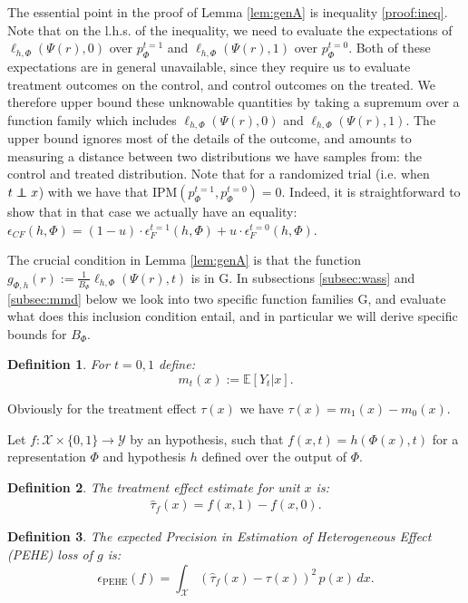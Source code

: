 \documentclass{article}
\newtheorem{thmappdef}{Definition}
\def\E{\mathbb{E}}
\def\cX{\mathcal X}
\def\cY{\mathcal Y}
\def\cF{\mathrm{G}}
\def \epehe{\epsilon_{\text{PEHE}}}
\newcommand\indep{\protect\mathpalette{\protect\independenT}{\perp}}
\def\independenT#1#2{\mathrel{\rlap{$#1#2$}\mkern2mu{#1#2}}}
\newcommand{\pc}{p^{t=0}}
\newcommand{\pt}{p^{t=1}}
\newcommand{\lythr}{\ell_{h,\Phi}(\Psi(r),t)}
\newcommand{\lyzerohpsi}{\ell_{h,\Phi}(\Psi(r),0)}
\newcommand{\lyonehpsi}{\ell_{h,\Phi}(\Psi(r),1)}
\begin{document}
The essential point in the proof of Lemma \ref{lem:genA} is inequality \ref{proof:ineq}. Note that on the l.h.s. of the inequality, we need to evaluate the expectations of $ \lyzerohpsi$ over $\pt_\Phi$ and $\lyonehpsi$ over $\pc_\Phi$. Both of these expectations are in general unavailable, since they require us to evaluate treatment outcomes on the control, and control outcomes on the treated. We therefore upper bound these unknowable quantities by taking a supremum over a function family which includes $\lyzerohpsi$ and $\lyonehpsi$. The upper bound ignores most of the details of the outcome, and amounts to measuring a distance between two distributions we have samples from: the control and treated distribution. Note that for a randomized trial (i.e. when $t \indep x$) with we have that $\text{IPM}(\pt_\Phi,\pc_\Phi) = 0$. Indeed, it is straightforward to show that in that case we actually have an equality: $\epsilon_{CF}(h,\Phi) = (1-u)\cdot \epsilon^{t=1}_{F}(h,\Phi) + u\cdot  \epsilon^{t=0}_{F}(h,\Phi)$.


The crucial condition in Lemma \ref{lem:genA} is that the function $g_{\Phi,h}(r) := \frac{1}{B_\Phi} \lythr$ is in $\cF$. In subsections \ref{subsec:wass} and \ref{subsec:mmd} below we look into two specific function families $\cF$, and evaluate what does this inclusion condition entail, and in particular we will derive specific bounds for $B_\Phi$.



\begin{thmappdef}\label{def:m}
For $t=0,1$ define:
$$m_t(x) := \E\left[Y_t|x\right].$$
\end{thmappdef}
Obviously for the treatment effect $\tau(x)$ we have $\tau(x) = m_1(x)-m_0(x)$.


Let $f: \cX \times \{0,1\} \rightarrow \cY$ by an hypothesis, such that $f(x,t) = h(\Phi(x),t)$ for a representation $\Phi$ and hypothesis $h$ defined over the output of $\Phi$.
\begin{thmappdef}\label{def:inditeerrA}
The treatment effect estimate for unit $x$ is:
\begin{align*}
\hat{\tau}_f  (x) = f(x,1) - f(x,0).
\end{align*}
\end{thmappdef}


\begin{thmappdef}
 The expected Precision in Estimation of Heterogeneous Effect (PEHE) loss of $g$ is:
$$\epehe(f) = \int_{\cX } \left( \hat{\tau}_f(x) - \tau(x) \right)^2 \, p(x) \, dx .$$
\end{thmappdef}
\end{document}

